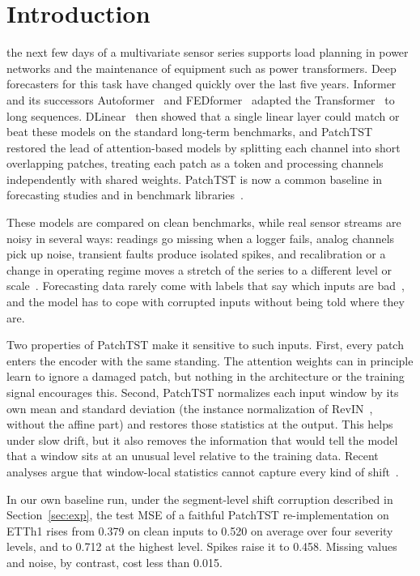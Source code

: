 \section{Introduction}
\label{sec:intro}

 the next few days of a multivariate sensor series supports load planning in power networks and the maintenance of equipment such as power transformers. Deep forecasters for this task have changed quickly over the last five years. Informer~\cite{informer} and its successors Autoformer~\cite{autoformer} and FEDformer~\cite{fedformer} adapted the Transformer~\cite{vaswani} to long sequences. DLinear~\cite{dlinear} then showed that a single linear layer could match or beat these models on the standard long-term benchmarks, and PatchTST~\cite{patchtst} restored the lead of attention-based models by splitting each channel into short overlapping patches, treating each patch as a token and processing channels independently with shared weights. PatchTST is now a common baseline in forecasting studies and in benchmark libraries~\cite{tslib}.

These models are compared on clean benchmarks, while real sensor streams are noisy in several ways: readings go missing when a logger fails, analog channels pick up noise, transient faults produce isolated spikes, and recalibration or a change in operating regime moves a stretch of the series to a different level or scale~\cite{blazquez_anomaly,gama_drift}. Forecasting data rarely come with labels that say which inputs are bad~\cite{seer}, and the model has to cope with corrupted inputs without being told where they are.

Two properties of PatchTST make it sensitive to such inputs. First, every patch enters the encoder with the same standing. The attention weights can in principle learn to ignore a damaged patch, but nothing in the architecture or the training signal encourages this. Second, PatchTST normalizes each input window by its own mean and standard deviation (the instance normalization of RevIN~\cite{revin}, without the affine part) and restores those statistics at the output. This helps under slow drift, but it also removes the information that would tell the model that a window sits at an unusual level relative to the training data. Recent analyses argue that window-local statistics cannot capture every kind of shift~\cite{fan,apt,revinrole}.

In our own baseline run, under the segment-level shift corruption described in Section~\ref{sec:exp}, the test MSE of a faithful PatchTST re-implementation on ETTh1 rises from 0.379 on clean inputs to 0.520 on average over four severity levels, and to 0.712 at the highest level. Spikes raise it to 0.458. Missing values and noise, by contrast, cost less than 0.015.

